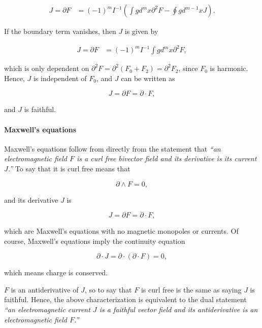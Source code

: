 \documentclass[twocolumn]{article}
\begin{document}
\begin{align}
  J = \partial F &= (-1)^m I^{-1} \left(\int g d^{m}x \partial^2 F - \oint g d^{m-1}x J \right).\label{eq:conditions}
\end{align}

If the boundary term vanishes, then $J$ is given by

\begin{align}
  J = \partial F &= (-1)^m I^{-1} \int g d^{m}x \partial^2 F,\label{eq:satisfied}
\end{align}

which is only dependent on $\partial^2 F = \partial^2 (F_0 + F_2) = \partial^2 F_2$, since $F_0$ is harmonic. Hence, $J$ is independent of $F_0$, and $J$ can be written as 

\begin{equation}
  J = \partial F = \partial \cdot F,
\end{equation}

and $J$ is faithful.

\paragraph{Maxwell's equations}

Maxwell's equations follow from directly from the statement that \emph{``an electromagnetic field $F$ is a curl free bivector field and its derivative is its current $J$.''} To say that it is curl free means that

\begin{equation}
  \partial \wedge F = 0,
\end{equation}

and its derivative $J$ is

\begin{equation}
  J = \partial F = \partial \cdot F,
\end{equation} 

which are Maxwell's equations with no magnetic monopoles or currents. Of course, Maxwell's equations imply the continuity equation

\begin{equation}
  \partial \cdot J = \partial \cdot (\partial \cdot F) = 0, \label{eq:continuity}
\end{equation} 

which means charge is conserved. 

$F$ is an antiderivative of $J$, so to say that $F$ is curl free is the same as saying $J$ is faithful. Hence, the above characterization is equivalent to the dual statement \emph{``an electromagnetic current $J$ is a faithful vector field and its antiderivative is an electromagnetic field $F$.''}
\end{document}
